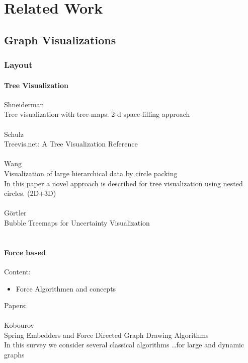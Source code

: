 \chapter{Related Work}

\section{Graph Visualizations}

\subsection{Layout}

\subsubsection{Tree Visualization}

Shneiderman \\
Tree visualization with tree-maps: 2-d space-filling approach\\
\\
Schulz\\
Treevis.net: A Tree Visualization Reference\\
\\
Wang\\
Visualization of large hierarchical data by circle packing\\
In this paper a novel approach is described for tree visualization using nested circles. (2D+3D)\\
\\
Görtler\\
Bubble Treemaps for Uncertainty Visualization\\
\\

\subsubsection{Force based}
Content:
\begin{itemize}
    \item Force Algorithmen and concepts 
\end{itemize}
Papers:\\
\\
Kobourov\\
Spring Embedders and Force Directed Graph Drawing Algorithms\\
In this survey we consider several classical algorithms \dots for large and dynamic graphs\\

